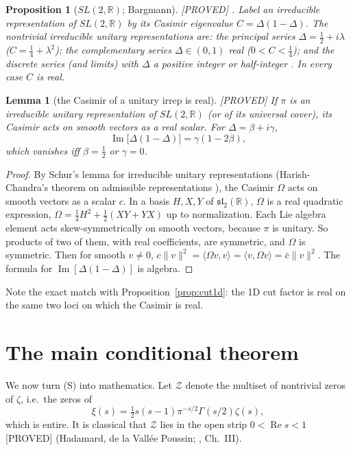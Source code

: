 \documentclass[11pt,a4paper]{article}
\theoremstyle{plain}
\newtheorem{proposition}[theorem]{Proposition}
\newtheorem{lemma}[theorem]{Lemma}
\theoremstyle{definition}
\theoremstyle{remark}
\newcommand{\R}{\mathbb{R}}
\newcommand{\lab}[1]{\textsf{\small[#1]}}
\newcommand{\PROVED}{\lab{PROVED}}
\renewcommand{\Re}{\operatorname{Re}}
\renewcommand{\Im}{\operatorname{Im}}
\begin{document}
\begin{proposition}[$SL(2,\R)$; Bargmann]\label{prop:sl2}
\PROVED{} \cite{Bargmann1947,Lang1975,Knapp1986}. Label an irreducible
representation of $SL(2,\R)$ by its Casimir eigenvalue $C=\Delta(1-\Delta)$.
The nontrivial irreducible unitary representations are:
the principal series $\Delta=\tfrac12+i\lambda$ ($C=\tfrac14+\lambda^2$);
the complementary series $\Delta\in(0,1)$ real ($0<C<\tfrac14$); and the
discrete series (and limits) with $\Delta$ a positive integer or half-integer
\cite{Knapp1986}. In every case $C$ is \emph{real}.
\end{proposition}

\begin{lemma}[the Casimir of a unitary irrep is real]\label{lem:casimir}
\PROVED{} If $\pi$ is an irreducible unitary representation of $SL(2,\R)$
(or of its universal cover), its Casimir acts on smooth vectors as a real
scalar. For $\Delta=\beta+i\gamma$,
\[
\Im\bigl[\Delta(1-\Delta)\bigr]=\gamma(1-2\beta),
\]
which vanishes iff $\beta=\tfrac12$ or $\gamma=0$.
\end{lemma}
\begin{proof}
By Schur's lemma for irreducible unitary representations (Harish-Chandra's
theorem on admissible representations \cite{Knapp1986}), the Casimir
$\Omega$ acts on smooth vectors as a scalar $c$. In a basis $H,X,Y$ of
$\mathfrak{sl}_2(\R)$, $\Omega$ is a real quadratic expression,
$\Omega=\tfrac14H^2+\tfrac12(XY+YX)$ up to normalization. Each Lie algebra
element acts skew-symmetrically on smooth vectors, because $\pi$ is
unitary. So products of two of them, with real coefficients, are
symmetric, and $\Omega$ is symmetric. Then for smooth $v\ne0$,
$c\|v\|^2=\langle\Omega v,v\rangle=\langle v,\Omega v\rangle=\bar c\|v\|^2$.
The formula for $\Im[\Delta(1-\Delta)]$ is algebra.
\end{proof}
\noindent
Note the exact match with Proposition~\ref{prop:cut1d}: the 1D cut factor
is real on the same two loci on which the Casimir is real.

\section{The main conditional theorem}
\label{sec:main}

We now turn (S) into mathematics. Let $\mathcal Z$ denote the multiset of
nontrivial zeros of $\zeta$, i.e.\ the zeros of
\[
\xi(s)=\tfrac12 s(s-1)\pi^{-s/2}\Gamma(s/2)\zeta(s),
\]
which is entire. It is classical that $\mathcal Z$ lies in the open strip
$0<\Re s<1$ \PROVED{} (Hadamard, de la Vall\'ee Poussin; \cite{Titchmarsh1986},
Ch.~III).
\end{document}
